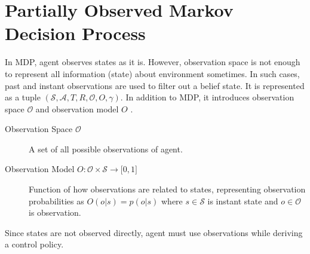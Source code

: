 \section{Partially Observed Markov Decision Process}
\label{sec:pomdp}

In MDP, agent observes states as it is. 
However, observation space is not enough to represent all information (state) about environment sometimes. 
In such cases, past and instant observations are used to filter out a belief state. 
It is represented as a tuple $(\mathcal{S},\mathcal{A},T,R,\mathcal{O},O,\gamma)$. 
In addition to MDP, it introduces observation space $\mathcal{O}$ and observation model $O$ \cite{francois-lavet_introduction_2018}. 

\begin{description}
	\item[Observation Space $\mathcal{O}$] A set of all possible observations of agent.
	\item[Observation Model $O \colon \mathcal{O} \times \mathcal{S} \rightarrow \lbrack 0,1 \rbrack$] Function of how observations are related to states, 
	representing observation probabilities as $O(o|s) = p(o|s)$ 
	where $s \in \mathcal{S}$ is instant state and $o \in \mathcal{O}$ is observation.
\end{description}

Since states are not observed directly, agent must use observations while deriving a control policy. 